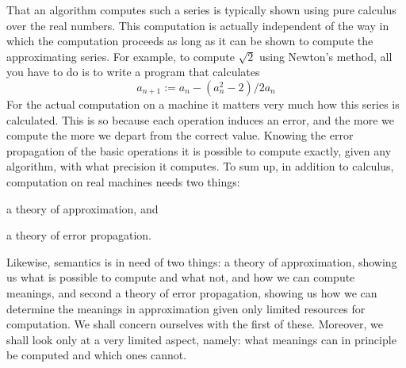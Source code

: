 That an algorithm computes such a series is typically shown using
pure calculus over the real numbers. This computation is actually
independent of the way in which the computation proceeds as long as it
can be shown to compute the approximating series. For example,
to compute $\sqrt{2}$ using Newton's method, all you have to
do is to write a program that calculates
\begin{equation}
a_{n+1} := a_n - (a_n^2 -2)/2a_n
\end{equation}
For the actual computation on a machine it matters very much
how this series is calculated. This is so because each operation
induces an error, and the more we compute the more we depart
from the correct value. Knowing the error propagation of the
basic operations it is possible to compute exactly, given
any algorithm, with what precision it computes. To sum up, in
addition to calculus, computation on real machines needs two
things:
\begin{dinglist}{43}
\item
a theory of approximation, and
\item
a theory of error propagation.
\end{dinglist}
Likewise, semantics is in need of two things: a theory of
approximation, showing us what is possible to compute and
what not, and how we can compute meanings, and second a
theory of error propagation, showing us how we can determine
the meanings in approximation given only limited resources
for computation. We shall concern ourselves with the first
of these. Moreover, we shall look only at a very limited
aspect, namely: what meanings can in principle be computed
and which ones cannot.

